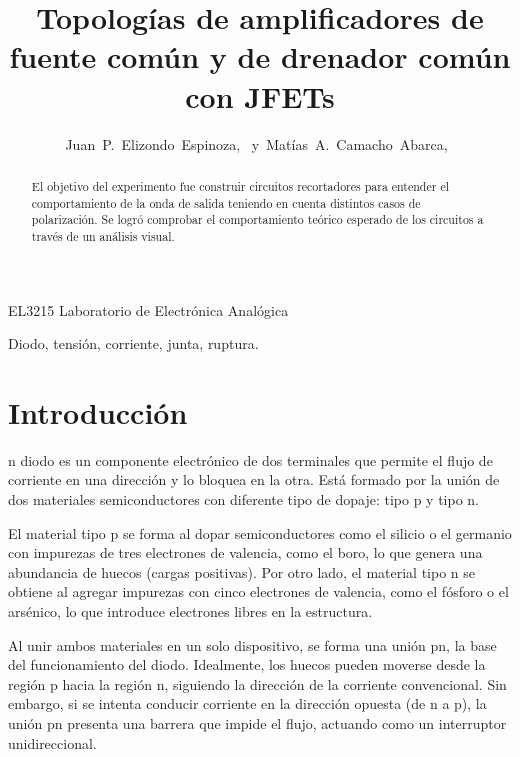 \documentclass[journal]{IEEEtran}
\begin{document}
\title{Topologías de amplificadores de fuente común y de drenador común con JFETs}


\author{Juan~P.~Elizondo~Espinoza,~
        y~Matías~A.~Camacho~Abarca,~
}


%
{EL3215 Laboratorio de Electrónica Analógica}


\maketitle


\begin{abstract}
El objetivo del experimento fue construir circuitos recortadores para entender el comportamiento de la onda de salida
teniendo en cuenta distintos casos de polarización. Se logró comprobar el comportamiento teórico esperado de los circuitos a través de un análisis visual.
\end{abstract}

\begin{IEEEkeywords}
Diodo, tensión, corriente, junta, ruptura.
\end{IEEEkeywords}


\section{Introducción}

n diodo es un componente electrónico de dos terminales que permite el flujo de corriente en una dirección y lo bloquea en la otra. Está formado por la unión de dos materiales semiconductores con diferente tipo de dopaje: tipo p y tipo n.

El material tipo p se forma al dopar semiconductores como el silicio o el germanio con impurezas de tres electrones de valencia, como el boro, lo que genera una abundancia de huecos (cargas positivas). Por otro lado, el material tipo n se obtiene al agregar impurezas con cinco electrones de valencia, como el fósforo o el arsénico, lo que introduce electrones libres en la estructura.

Al unir ambos materiales en un solo dispositivo, se forma una unión pn, la base del funcionamiento del diodo. Idealmente, los huecos pueden moverse desde la región p hacia la región n, siguiendo la dirección de la corriente convencional. Sin embargo, si se intenta conducir corriente en la dirección opuesta (de n a p), la unión pn presenta una barrera que impide el flujo, actuando como un interruptor unidireccional.
\end{document}
